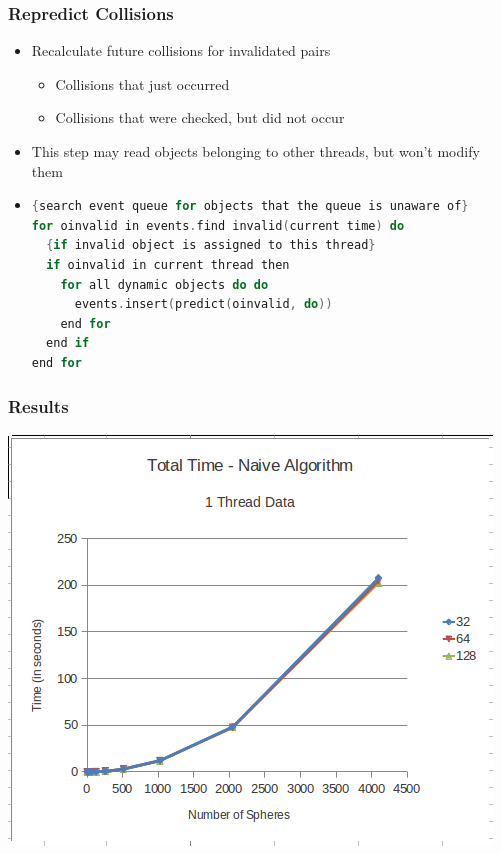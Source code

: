 \documentclass{beamer}
\begin{document}
\begin{frame}[fragile]
	\frametitle{Repredict Collisions}
	\begin{itemize}
		\item Recalculate future collisions for invalidated pairs
		\begin{itemize}
			\item Collisions that just occurred
			\item Collisions that were checked, but did not occur
		\end{itemize}
		\item This step may read objects belonging to other threads, but won't modify them
		\item
	\begin{lstlisting}[language=C,basicstyle=\footnotesize,frame=single,tabsize=4,title=Repredict]
{search event queue for objects that the queue is unaware of}
for oinvalid in events.find invalid(current time) do
  {if invalid object is assigned to this thread}
  if oinvalid in current thread then
    for all dynamic objects do do
      events.insert(predict(oinvalid, do))
    end for
  end if
end for
	\end{lstlisting}
	\end{itemize}
\end{frame}

\begin{frame}
	\frametitle{Results}
	\begin{center}
		\includegraphics[width=.75\textwidth]{runtime_naive_1thread.png}
	\end{center}
\end{frame}
\end{document}
